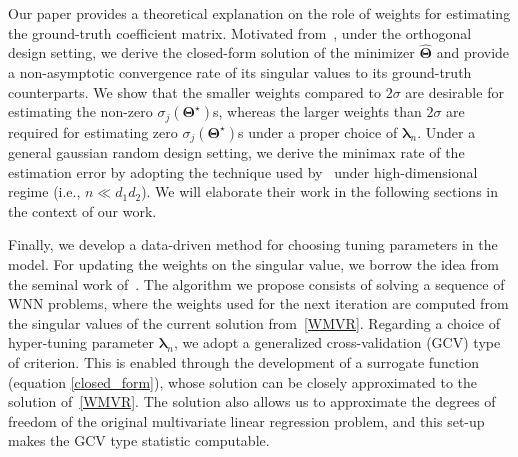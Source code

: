 \documentclass[alpha-refs]{wiley-article}
\begin{document}
Our paper provides a theoretical explanation on the role of weights for estimating the ground-truth coefficient matrix.
Motivated from~\citet{yuan2007dimension}, under the orthogonal design setting, we derive the closed-form solution of the minimizer $\widehat{\boldsymbol{\Theta}}$ and provide a non-asymptotic convergence rate of its singular values to its ground-truth counterparts. 
We show that the smaller weights compared to $2\sigma$ are desirable for estimating the non-zero $\sigma_{j}(\boldsymbol{\Theta}^{\star})$s, whereas the larger weights than $2\sigma$ are required for estimating zero $\sigma_{j}(\boldsymbol{\Theta}^{\star})$s under a proper choice of $\boldsymbol{\lambda}_{n}$.
Under a general gaussian random design setting, we derive the minimax rate of the estimation error by adopting the technique used by~\citet{negahban2011estimation} under high-dimensional regime (i.e., $n \ll d_{1}d_{2}$).
We will elaborate their work in the following sections in the context of our work.

Finally, we develop a data-driven method for choosing tuning parameters in the model.
For updating the weights on the singular value, we borrow the idea from the seminal work of~\citet{candes2008enhancing}.
The algorithm we propose consists of solving a sequence of WNN problems, where the weights used for the next iteration are computed from the singular values of the current solution from~\eqref{WMVR}.
Regarding a choice of hyper-tuning parameter $\boldsymbol{\lambda}_{n}$, we adopt a generalized cross-validation (GCV) type of criterion.
This is enabled through the development of a surrogate function (equation \eqref{closed_form}), whose solution can be closely approximated to the solution of~\eqref{WMVR}. The solution also allows us to approximate the degrees of freedom of the original multivariate linear regression problem,  and this set-up makes the GCV type statistic computable.

\end{document}
